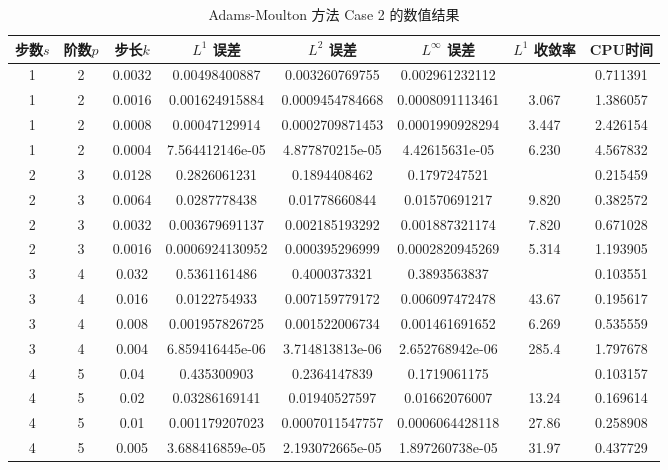 \documentclass[a4paper]{article}
\begin{document}
\begin{table}
    \centering
    \caption{Adams-Moulton 方法 Case 2 的数值结果}
    \begin{tabular}{|c|c|c|c|c|c|c|c|}
        \hline
        步数$s$ & 阶数$p$ & 步长$k$ & $L^1$ 误差  & $L^2$ 误差 & $L^\infty$ 误差 & $L^1$ 收敛率 & CPU时间 \\
        \hline 
        1 & 2 & 0.0032 & 0.00498400887 & 0.003260769755 & 0.002961232112 & ~ & 0.711391 \\
        1 & 2 & 0.0016 & 0.001624915884 & 0.0009454784668 & 0.0008091113461 & 3.067 & 1.386057 \\
        1 & 2 & 0.0008 & 0.00047129914 & 0.0002709871453 & 0.0001990928294 & 3.447 & 2.426154 \\
        1 & 2 & 0.0004 & 7.564412146e-05 & 4.877870215e-05 & 4.42615631e-05 & 6.230 & 4.567832 \\
        \hline 
        2 & 3 & 0.0128 & 0.2826061231 & 0.1894408462 & 0.1797247521 & ~ & 0.215459 \\
        2 & 3 & 0.0064 & 0.0287778438 & 0.01778660844 & 0.01570691217 & 9.820 & 0.382572 \\
        2 & 3 & 0.0032 & 0.003679691137 & 0.002185193292 & 0.001887321174 & 7.820 & 0.671028 \\
        2 & 3 & 0.0016 & 0.0006924130952 & 0.000395296999 & 0.0002820945269 & 5.314 & 1.193905 \\
        \hline
        3 & 4 & 0.032 & 0.5361161486 & 0.4000373321 & 0.3893563837 & ~ & 0.103551 \\ 
        3 & 4 & 0.016 & 0.0122754933 & 0.007159779172 & 0.006097472478 & 43.67 & 0.195617 \\
        3 & 4 & 0.008 & 0.001957826725 & 0.001522006734 & 0.001461691652 & 6.269 & 0.535559 \\
        3 & 4 & 0.004 & 6.859416445e-06 & 3.714813813e-06 & 2.652768942e-06 & 285.4 & 1.797678 \\
        \hline
        4 & 5 & 0.04 & 0.435300903 & 0.2364147839 & 0.1719061175 & ~ & 0.103157 \\ 
        4 & 5 & 0.02 & 0.03286169141 & 0.01940527597 & 0.01662076007 & 13.24 & 0.169614 \\
        4 & 5 & 0.01 & 0.001179207023 & 0.0007011547757 & 0.0006064428118 & 27.86 & 0.258908 \\
        4 & 5 & 0.005 & 3.688416859e-05 & 2.193072665e-05 & 1.897260738e-05 & 31.97 & 0.437729 \\
        \hline 
    \end{tabular}
\end{table}
\end{document}
